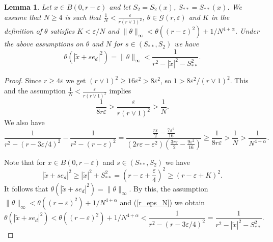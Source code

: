 \documentclass[a4paper,12pt,reqno]{amsart}
\newtheorem{lemma}[theorem]{Lemma}
\theoremstyle{definition}
\theoremstyle{remark}
\newcommand{\eps}{\varepsilon}
\newcommand{\calG}{\mathcal{G}}
\begin{document}
\begin{lemma}
\label{S_**_N} Let $x \in B(0,r - \eps)$ and let $S_2= S_2(x)$, $S_{**}= S_{**}(x)$. 
We assume that $N \ge 4$ is such that $\frac{1}{N} < \frac{\eps}{r(r \vee 1)^2}$, $\theta \in \calG(r,\eps)$ and $K$ in the definition of $\theta$ satisfies $K < \eps/N$ and $\|\theta\|_{\infty} < \theta((r - \eps)^2) + 1/N^{4+\alpha}$. Under the above assumptions on $\theta$ and $N$  for $s \in (S_{**},S_2)$ we have
$$
\theta(|\tilde{x} + s e_d|^2) = \|\theta\|_{\infty} < \frac{1}{r^2 - |\tilde{x}|^2 - S_{**}^2}.
$$
\end{lemma}
\begin{proof}
Since $r \ge 4 \eps$ we get $(r \vee 1)^2 \ge 16 \eps^2 > 8 \eps^2$, so $1 > 8 \eps^2/(r \vee 1)^2$. This and the assumption $\frac{1}{N} < \frac{\eps}{r(r \vee 1)^2}$ implies
\begin{equation*}
\frac{1}{8 r \eps} > \frac{\eps}{r (r \vee 1)^2} > \frac{1}{N}.
\end{equation*}
We also have
\begin{equation}
\label{r_eps_N}
\frac{1}{r^2 - (r - 3 \eps/4)^2} - \frac{1}{r^2 - (r - \eps)^2} 
=
\frac{\frac{r \eps}{2} - \frac{7 \eps^2}{16}}{\left(2r \eps - \eps^2\right)\left(\frac{3r \eps}{2} - \frac{9 \eps^2}{16} \right)}
\ge \frac{1}{8 r \eps}
> \frac{1}{N}
> \frac{1}{N^{4+\alpha}}.
\end{equation}

Note that for $x \in B(0, r - \eps)$ and $s \in (S_{**},S_2)$ we have 
\begin{equation*}
|\tilde{x} + s e_d|^2 
\ge |\tilde{x}|^2 + S_{**}^2
= \left(r - \eps + \frac{\eps}{4}\right)^2
\ge \left(r - \eps + K\right)^2.
\end{equation*}
It follows that $\theta(|\tilde{x} + s e_d|^2) = \|\theta\|_{\infty}$. By this, the assumption $\|\theta\|_{\infty} < \theta((r - \eps)^2) + 1/N^{4+\alpha}$ and (\ref{r_eps_N}) we obtain
$$
\theta(|\tilde{x} + s e_d|^2) 
< \theta((r - \eps)^2) + 1/N^{4+\alpha}
< \frac{1}{r^2 - (r - 3 \eps/4)^2}
= \frac{1}{r^2 - |\tilde{x}|^2 - S_{**}^2}.
$$
\end{proof}
\end{document}
